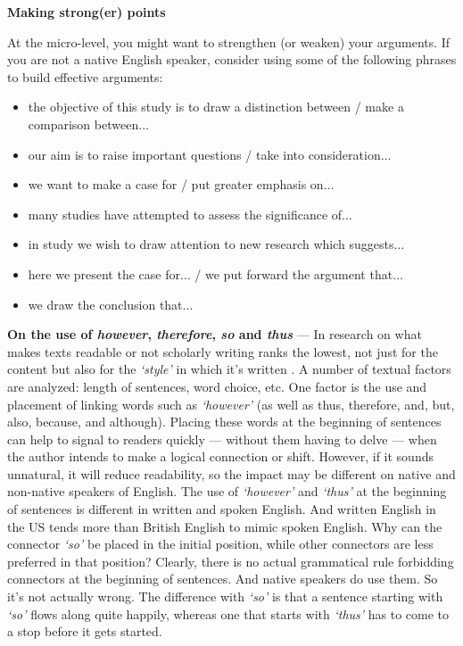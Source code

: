 \documentclass[graybox,envcountchap,sectrefs,UStrade]{svmono}
\newenvironment{fminipage}{\begin{Sbox}\begin{minipage}}{\end{minipage}\end{Sbox}\fbox{\TheSbox}}
\begin{document}
\begin{flushleft}
\textbf{Making strong(er) points}
\end{flushleft}

\noindent At the micro-level, you might want to strengthen (or weaken) your arguments. If you are not a native English speaker, consider using some of the following phrases to build effective arguments:

\begin{itemize}
  \item the objective of this study is to draw a distinction between / make a comparison between$\ldots$
  \item our aim is to raise important questions / take into consideration$\ldots$
  \item we want to make a case for / put greater emphasis on$\ldots$
  \item many studies have attempted to assess the significance of$\ldots$
  \item in study we wish to draw attention to new research which suggests$\ldots$
  \item here we present the case for$\ldots$ / we put forward the argument that$\ldots$
  \item we draw the conclusion that$\ldots$
\end{itemize}

\bigskip
\begin{fminipage}{.9\textwidth}{\footnotesize{\textsf{\textbf{On the use of \emph{however}, \emph{therefore}, \emph{so} and \emph{thus}}} --- In research on what makes texts readable or not scholarly writing ranks the lowest, not just for the content but also for the \emph{`style'} in which it's written \citep{Raymond1993CCC}. A number of textual factors are analyzed: length of sentences, word choice, etc. One factor is the use and placement of linking words such as \emph{`however'} (as well as thus, therefore, and, but, also, because, and although). Placing these words at the beginning of sentences can help to signal to readers quickly --- without them having to delve --- when the author intends to make a logical connection or shift. However, if it sounds unnatural, it will reduce readability, so the impact may be different on native and non-native speakers of English. The use of \emph{`however'} and \emph{`thus'} at the beginning of sentences is different in written and spoken English. And written English in the US tends more than British English to mimic spoken English. Why can the connector \emph{`so'} be placed in the initial position, while other connectors are less preferred in that position? Clearly, there is no actual grammatical rule forbidding connectors at the beginning of sentences. And native speakers do use them. So it's not actually wrong. The difference with \emph{`so'} is that a sentence starting with \emph{`so'} flows along quite happily, whereas one that starts with \emph{`thus'} has to come to a stop before it gets started.}}
\end{fminipage}
\bigskip
\end{document}
